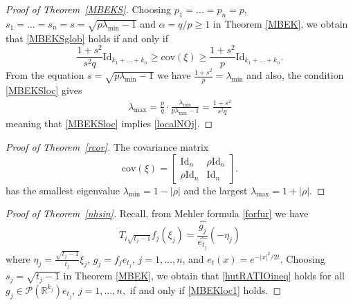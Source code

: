 \documentclass[9pt, a4paper]{amsart}
\newcommand{\1}{{\chi_{}}}%
\numberwithin{equation}{section}
\begin{document}
	\begin{proof}[Proof of Theorem~\ref{MBEKS}]
		Choosing $p_1=\ldots=p_n=p$, $s_1=\ldots=s_n=s=\sqrt{p\lambda_{\min}-1}$ and $\alpha=q/p\geq1$ in Theorem \ref{MBEK}, we obtain that \eqref{MBEKSglob} holds if and only if
			\begin{equation}\label{localNOj}
			\frac{1+s^{2}}{s^{2}q} \mathrm{Id}_{k_{1}+\ldots+k_{n}}\geq \mathrm{cov}(\xi) \geq \frac{1+s^{2}}{p} \mathrm{Id}_{k_{1}+\ldots+k_{n}}.  
		\end{equation}
	From the equation $s=\sqrt{p\lambda_{\min}-1}$  we have $\frac{1+s^2}{p}=\lambda_{\min}$ and also, the condition   \eqref{MBEKSloc} gives
		\begin{align*}
			\lambda_{\max} =\frac{p}{q}\cdot\frac{\lambda_{\min}}{p\lambda_{\min}-1}=  \frac{1+s^{2}}{s^{2}q}
		\end{align*}
		meaning that \eqref{MBEKSloc} implies \eqref{localNOj}.
	\end{proof}

\begin{proof}[Proof of Theorem~\ref{rcor}]
The covariance matrix
\[
\mathrm{cov}(\xi) = 
\begin{bmatrix}
	\mathrm{Id}_n & \rho \mathrm{Id}_n \\
	\rho \mathrm{Id}_n & \mathrm{Id}_n
\end{bmatrix}.
\]
has the smallest eigenvalue $\lambda_{\min}=1-|\rho|$ and the largest  $\lambda_{\max}=1+|\rho|$.
\end{proof}

\begin{proof}[Proof of Theorem~\ref{nhsin}]
	Recall, from Mehler formula \eqref{forfur} we have 
	\begin{equation}
		T_{i\sqrt{t_j-1}}f_j(\xi_j)=\frac{\widehat{g_j}}{\widehat{e_{t_j}}}\left( -\eta_j\right)
	\end{equation}
where $\eta_{j} = \frac{\sqrt{t_{j}-1}}{t_{j}} \xi_{j} $, $g_j=f_je_{t_j}$,  $j=1, \ldots, n$,  and $ e_{t}(x) = e^{-|x|^{2}/2t}$. Choosing $s_j=\sqrt{t_j-1}$ in Theorem \ref{MBEK}, we obtain that \eqref{hutRATIOineq} holds for all $g_{j}\in \mathcal{P}(\mathbb{R}^{k_{j}}) e_{t_{j}}$, $j=1, \ldots, n,$ if and only if \eqref{MBEKloc1} holds. 
\end{proof}
\end{document}
